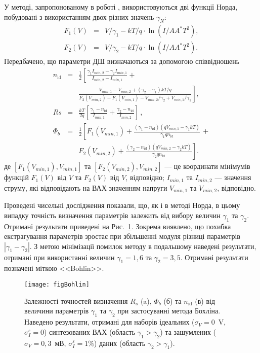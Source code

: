 У методі, запропонованому в роботі \cite{Bohlin}, використовуються дві функції Норда, побудовані з використанням двох різних значень $\gamma_N$:
\begin{eqnarray}
\label{eqBohlin}
F_1(V)&=&V/\gamma_1-kT/q\cdot\ln(I/AA^*T^2),
\nonumber\\
F_2(V)&=&V/\gamma_2-kT/q\cdot\ln(I/AA^*T^2).
\end{eqnarray}
Передбачено, що параметри ДШ визначаються за допомогою співвідношень
\begin{eqnarray}
\label{eqBohlinDet}
n_\mathrm{id}&=&\frac{1}{2}\left[\frac{\gamma_1I_{min,2}-\gamma_2I_{min,1}}{I_{min,2}-I_{min,1}}+\right.
\\
&&\left.\frac{V_{min,1}-V_{min,2}+(\gamma_2-\gamma_1)kT/q}{F_2(V_{min,2})-F_1(V_{min,1})-V_{min,2}/\gamma_2+V_{min,1}/\gamma_1}\right]
,\nonumber
\\
Rs&=&\frac{kT}{2q}\left[\frac{\gamma_1-n_\mathrm{id}}{I_{min,1}}+\frac{\gamma_2-n_\mathrm{id}}{I_{min,2}}\right]\,,
\\
\Phi_b&=&\frac{1}{2}\left[F_1(V_{min,1})+\frac{(\gamma_1-n_\mathrm{id})(qV_{min,1}-\gamma_1kT)}{\gamma_1qn_\mathrm{id}}\,+\right.
\nonumber\\
&&\left.F_2(V_{min,2})+\frac{(\gamma_2-n_\mathrm{id})(qV_{min,2}-\gamma_2kT)}{\gamma_2qn_\mathrm{id}}\right].
\end{eqnarray}
де
$[F_1(V_{min,1}), V_{min,1}]$ та $[F_2(V_{min,2}), V_{min,2}]$ --- це координати мінімумів функцій  $F_1(V)$ від $V$ та $F_2(V)$ від $V$, відповідно;
$I_{min,1}$ та $I_{min,2}$ --- значення струму, які відповідають на ВАХ значенням напруги $V_{min,1}$ та $V_{min,2}$, відповідно.

Проведені чисельні дослідження показали, що, як і в методі Норда, в цьому випадку точність визначення параметрів залежить від вибору величин $\gamma_1$ та $\gamma_2$.
Отримані результати приведені на Рис.~\ref{figBohlin}.
Зокрема виявлено, що похибка екстрагування параметрів зростає при збільшенні модуля різниці параметрів $|\gamma_1-\gamma_2|$.
З метою мінімізації помилок методу в подальшому наведені результати, отримані при використанні величин $\gamma_1=1,6$ та $\gamma_2=3,5$.
Отримані результати позначені міткою <<Bohlin>>.

\begin{figure}
\center
\texttt{[image: figBohlin]}%
\caption{\label{figBohlin}
Залежності точностей визначення $R_s$ (a), $\Phi_b$ (б) та $n_\mathrm{id}$ (в) від величини параметрів $\gamma_1$ та $\gamma_2$ при застосуванні метода Бохліна.
Наведено результати, отримані для наборів ідеальних ($\sigma_V=0$~V, $\sigma_I^\varepsilon=0$) синтезованих ВАХ (область $\gamma_1>\gamma_2$) та зашумлених ($\sigma_V=0,3$~мВ, $\sigma_I^\varepsilon=1\%$) даних (область $\gamma_2>\gamma_1$).
}
\end{figure}

